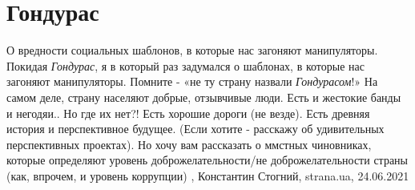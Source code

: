  
 
 
 
 
\chapter{Гондурас}
\label{sec:slova.gonduras}

О вредности социальных шаблонов, в которые нас загоняют манипуляторы.  Покидая
\emph{Гондурас}, я в который раз задумался о шаблонах, в которые нас загоняют
манипуляторы. Помните - «не ту страну назвали \emph{Гондурасом}!» На самом деле, страну
населяют добрые, отзывчивые люди. Есть и жестокие банды и негодяи.. Но где их
нет?! Есть хорошие дороги (не везде). Есть древняя история и перспективное
будущее. (Если хотите - расскажу об удивительных перспективных проектах).  Но
хочу вам рассказать о ммстных чиновниках, которые определяют уровень
доброжелательности/не доброжелательности страны (как, впрочем, и уровень
коррупции)
, Константин Стогний, strana.ua, 24.06.2021
